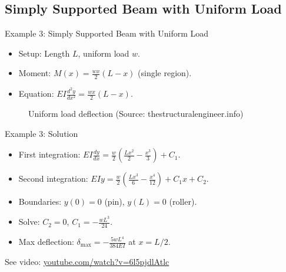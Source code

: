 \documentclass{beamer}
\begin{document}
\subsection{Simply Supported Beam with Uniform Load}
\begin{frame}{Example 3: Simply Supported Beam with Uniform Load}
    \begin{itemize}
        \item Setup: Length \( L \), uniform load \( w \).
        \item Moment: \( M(x) = \frac{wx}{2}(L - x) \) (single region).
        \item Equation: \( EI \frac{d^2y}{dx^2} = \frac{wx}{2}(L - x) \).
    \end{itemize}
    \begin{figure}
        \centering
        \caption{Uniform load deflection (Source: thestructuralengineer.info)}
    \end{figure}
\end{frame}

\begin{frame}{Example 3: Solution}
    \begin{itemize}
        \item First integration: \( EI \frac{dy}{dx} = \frac{w}{2}(\frac{Lx^2}{2} - \frac{x^3}{3}) + C_1 \).
        \item Second integration: \( EI y = \frac{w}{2}(\frac{Lx^3}{6} - \frac{x^4}{12}) + C_1 x + C_2 \).
        \item Boundaries: \( y(0) = 0 \) (pin), \( y(L) = 0 \) (roller).
        \item Solve: \( C_2 = 0 \), \( C_1 = -\frac{wL^3}{24} \).
        \item Max deflection: \( \delta_{\text{max}} = -\frac{5wL^4}{384EI} \) at \( x = L/2 \).
    \end{itemize}
    See video: \href{https://www.youtube.com/watch?v=6l5pjdlAtlc}{youtube.com/watch?v=6l5pjdlAtlc}
\end{frame}

\end{document}
